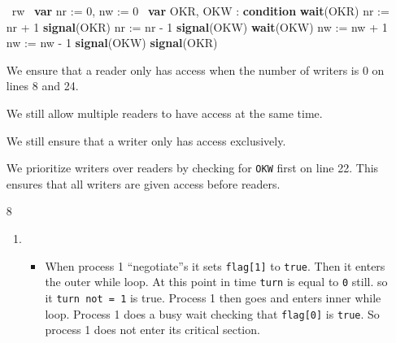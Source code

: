 \documentclass[12pt,letterpaper]{article}
\begin{document}
\begin{enumerate}
      \begin{algorithm}
        \begin{algorithmic}[1]
          \Monitor \ rw
            \State \ \textbf{var} nr := 0, nw := 0
            \State \ \textbf{var} OKR, OKW : \textbf{condition}
                \textbf{wait}(OKR)
              \EndIf
              \State nr := nr + 1
              \State \textbf{signal}(OKR)
            \EndProcedure
              \State nr := nr - 1
                \textbf{signal}(OKW)
              \EndIf
            \EndProcedure
                \textbf{wait}(OKW)
              \EndIf
              \State nw := nw + 1
            \EndProcedure
              \State nw := nw - 1
                \textbf{signal}(OKW)
                \textbf{signal}(OKR)
              \EndIf
            \EndProcedure
          \End
        \end{algorithmic}
      \end{algorithm}

    \pagebreak
      We ensure that a reader only has access when the number of writers is 0 on lines 8 and 24.

      We still allow multiple readers to have access at the same time.

      We still ensure that a writer only has access exclusively.

      We prioritize writers over readers by checking for \texttt{OKW} first on line 22.
      This ensures that all writers are given access before readers.

    \item [8]
      \begin{enumerate}
        \item
          \begin{itemize}
            \item
              When process 1 ``negotiate''s it sets \texttt{flag[1]} to \texttt{true}.
              Then it enters the outer while loop.
              At this point in time \texttt{turn} is equal to \texttt{0} still.
              so it \texttt{turn not = 1} is true.
              Process 1 then goes and enters inner while loop.
              Process 1 does a busy wait checking that \texttt{flag[0]} is \texttt{true}.
              So process 1 does not enter its critical section.


\end{itemize}
\end{enumerate}
\end{enumerate}
\end{document}
